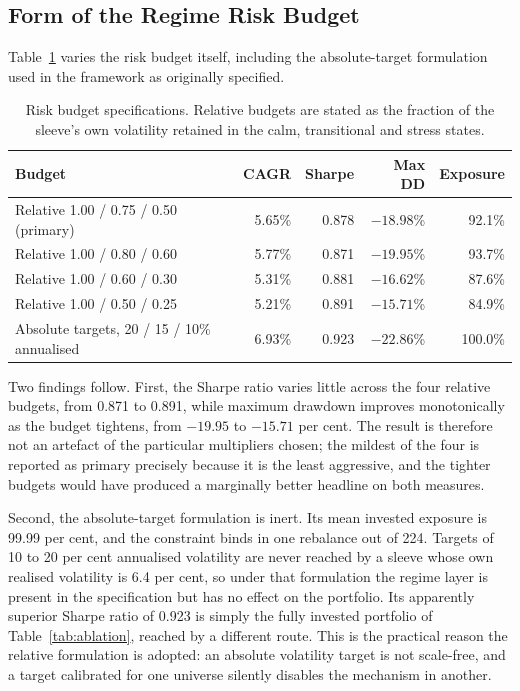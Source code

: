\subsection{Form of the Regime Risk Budget}

Table~\ref{tab:budget} varies the risk budget itself, including the absolute-target formulation used
in the framework as originally specified.

\begin{table}[!ht]
\centering
\caption{Risk budget specifications. Relative budgets are stated as the fraction of the
sleeve's own volatility retained in the calm, transitional and stress states.}
\label{tab:budget}
\small
\begin{tabular}{p{4.6cm}rrrr}
\hline
\textbf{Budget} & \textbf{CAGR} & \textbf{Sharpe} & \textbf{Max DD} & \textbf{Exposure} \\
\hline
Relative 1.00 / 0.75 / 0.50 (primary) & 5.65\% & 0.878 & $-18.98$\% & 92.1\% \\
Relative 1.00 / 0.80 / 0.60 & 5.77\% & 0.871 & $-19.95$\% & 93.7\% \\
Relative 1.00 / 0.60 / 0.30 & 5.31\% & 0.881 & $-16.62$\% & 87.6\% \\
Relative 1.00 / 0.50 / 0.25 & 5.21\% & 0.891 & $-15.71$\% & 84.9\% \\
Absolute targets, 20 / 15 / 10\% annualised & 6.93\% & 0.923 & $-22.86$\% & 100.0\% \\
\hline
\end{tabular}
\end{table}

Two findings follow. First, the Sharpe ratio varies little across the four relative
budgets, from 0.871 to 0.891, while maximum drawdown improves monotonically as the
budget tightens, from $-19.95$ to $-15.71$ per cent. The result is therefore not an
artefact of the particular multipliers chosen; the mildest of the four is reported as
primary precisely because it is the least aggressive, and the tighter budgets would
have produced a marginally better headline on both measures.

Second, the absolute-target formulation is inert. Its mean invested exposure is 99.99
per cent, and the constraint binds in one rebalance out of 224. Targets of 10 to 20 per
cent annualised volatility are never reached by a sleeve whose own realised volatility
is 6.4 per cent, so under that formulation the regime layer is present in the
specification but has no effect on the portfolio. Its apparently superior Sharpe ratio
of 0.923 is simply the fully invested portfolio of Table~\ref{tab:ablation}, reached by a
different route. This is the practical reason the relative formulation is adopted: an
absolute volatility target is not scale-free, and a target calibrated for one universe
silently disables the mechanism in another.

